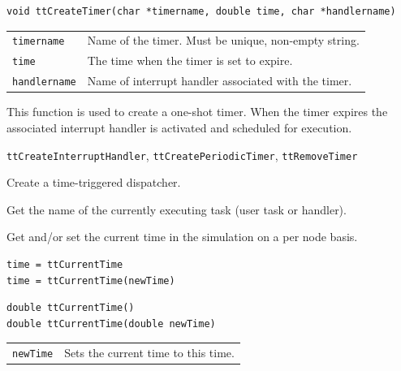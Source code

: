 \documentclass[final,twoside]{rapport}
\begin{document}
\Csyntax
\begin{verbatim}
void ttCreateTimer(char *timername, double time, char *handlername)
\end{verbatim}

\args
\begin{tabularx}{\hsize}{l>{\raggedright\arraybackslash}X}
    {\tt timername} & Name of the timer. Must be unique, non-empty
  string.\\
  {\tt time} & The time when the timer is set to expire. \\
  {\tt handlername} & Name of interrupt handler associated with the timer.
\end{tabularx}

\descr This function is used to create a one-shot timer. When the
timer expires the associated interrupt handler is activated and
scheduled for execution. 

\seealso
{\tt ttCreateInterruptHandler}, {\tt ttCreatePeriodicTimer}, {\tt ttRemoveTimer}



\purpose
Create a time-triggered dispatcher.



\purpose
Get the name of the currently executing task (user task or handler).



\purpose
Get and/or set the current time in the simulation on a per node basis.

\Msyntax
\begin{verbatim}
time = ttCurrentTime
time = ttCurrentTime(newTime)
\end{verbatim}

\Csyntax
\begin{verbatim}
double ttCurrentTime()
double ttCurrentTime(double newTime)
\end{verbatim}

\args
\begin{tabularx}{\hsize}{l>{\raggedright\arraybackslash}X}
  {\tt newTime} & Sets the current time to this time. \\
\end{tabularx}
\end{document}
